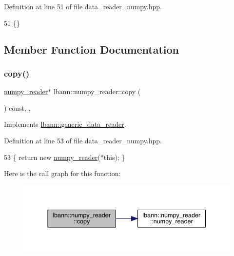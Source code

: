 Definition at line 51 of file data\+\_\+reader\+\_\+numpy.\+hpp.


\begin{DoxyCode}
51 \{\}
\end{DoxyCode}


\subsection{Member Function Documentation}
\mbox{\label{classlbann_1_1numpy__reader_a86bebc5eb7869d1df5e8cca76f503069}} 
\subsubsection{\texorpdfstring{copy()}{copy()}}
{\footnotesize\ttfamily \hyperlink{classlbann_1_1numpy__reader}{numpy\+\_\+reader}$\ast$ lbann\+::numpy\+\_\+reader\+::copy (\begin{DoxyParamCaption}{ }\end{DoxyParamCaption}) const\hspace{0.3cm}{\ttfamily [inline]}, {\ttfamily [override]}, {\ttfamily [virtual]}}



Implements \hyperlink{classlbann_1_1generic__data__reader_a208ba1223e7aaa75e94b728501f12f86}{lbann\+::generic\+\_\+data\+\_\+reader}.



Definition at line 53 of file data\+\_\+reader\+\_\+numpy.\+hpp.


\begin{DoxyCode}
53 \{ \textcolor{keywordflow}{return} \textcolor{keyword}{new} \hyperlink{classlbann_1_1numpy__reader_a77718f4e8fad1e74289e5d446587ba83}{numpy\_reader}(*\textcolor{keyword}{this}); \}
\end{DoxyCode}
Here is the call graph for this function\+:\nopagebreak
\begin{figure}[H]
\begin{center}
\leavevmode
\includegraphics[width=337pt]{classlbann_1_1numpy__reader_a86bebc5eb7869d1df5e8cca76f503069_cgraph}
\end{center}
\end{figure}
\mbox{\label{classlbann_1_1numpy__reader_ab08dc207eaae7c7f5a70e602da3c1be0}} 
